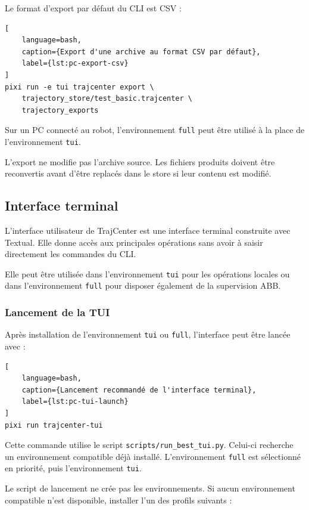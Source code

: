\documentclass{rapportENSAM}
\begin{document}
Le format d'export par défaut du CLI est CSV :

\begin{lstlisting}[
    language=bash,
    caption={Export d'une archive au format CSV par défaut},
    label={lst:pc-export-csv}
]
pixi run -e tui trajcenter export \
    trajectory_store/test_basic.trajcenter \
    trajectory_exports
\end{lstlisting}

Sur un PC connecté au robot, l'environnement \texttt{full} peut être utilisé
à la place de l'environnement \texttt{tui}.

L'export ne modifie pas l'archive source. Les fichiers produits doivent être
reconvertis avant d'être replacés dans le store si leur contenu est modifié.

\FloatBarrier

\subsection{Interface terminal}
\label{subsec:pc-tui}



L'interface utilisateur de TrajCenter est une interface terminal construite
avec Textual. Elle donne accès aux principales opérations sans avoir à saisir
directement les commandes du CLI.

Elle peut être utilisée dans l'environnement \texttt{tui} pour les opérations
locales ou dans l'environnement \texttt{full} pour disposer également de la
supervision ABB.


\subsubsection{Lancement de la TUI}
\label{subsubsec:pc-tui-launch}

Après installation de l'environnement \texttt{tui} ou \texttt{full},
l'interface peut être lancée avec :

\begin{lstlisting}[
    language=bash,
    caption={Lancement recommandé de l'interface terminal},
    label={lst:pc-tui-launch}
]
pixi run trajcenter-tui
\end{lstlisting}

Cette commande utilise le script \texttt{scripts/run\_best\_tui.py}. Celui-ci
recherche un environnement compatible déjà installé. L'environnement
\texttt{full} est sélectionné en priorité, puis l'environnement
\texttt{tui}.

Le script de lancement ne crée pas les environnements. Si aucun environnement
compatible n'est disponible, installer l'un des profils suivants :
\end{document}
